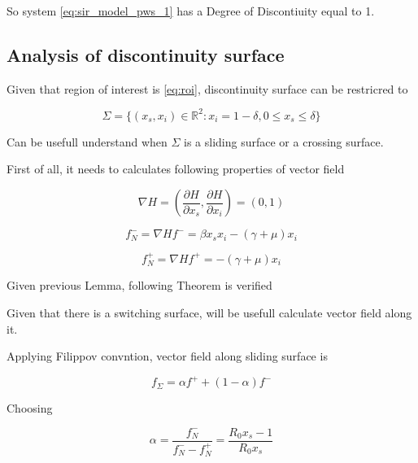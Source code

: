 So system \ref{eq:sir_model_pws_1} has a Degree of Discontiuity equal to 1.

\subsection{Analysis of discontinuity surface}
Given that region of interest is \ref{eq:roi}, discontinuity surface can be restricred to

\begin{equation}
    \label{eq:switching_manifold}
    \Sigma = \{ (x_s,x_i) \in \mathbb{R}^2 : x_i = 1-\delta, 0 \leq x_s \leq \delta \}
\end{equation}

Can be usefull understand when $\Sigma$ is a sliding surface or a crossing surface.

First of all, it needs to calculates following properties of vector field

\begin{equation}
    \nabla H = \left(\frac{\partial H}{\partial x_s}, \frac{\partial H}{\partial x_i}\right) = (0,1)
\end{equation}

\begin{equation}
    \label{eq:f-}
    f^-_N = \nabla H f^- = \beta x_sx_i-(\gamma + \mu)x_i
\end{equation}

\begin{equation}
    \label{eq:f+}
    f^+_N = \nabla H f^+ = -(\gamma + \mu)x_i
\end{equation}





Given previous Lemma, following Theorem is verified



Given that there is a switching surface, will be usefull calculate vector field along it.

Applying Filippov convntion, vector field along sliding surface is

\begin{equation}
    \label{eq:switching_surface_vector_field_1}
    f_\Sigma = \alpha f^+ + (1-\alpha)f^-
\end{equation}

Choosing

\begin{equation}
    \label{eq:switching_surface_alpha}
    \alpha = \frac{f^-_N}{f^-_N-f^+_N} = \frac{R_0x_s-1}{R_0x_s}
\end{equation}

